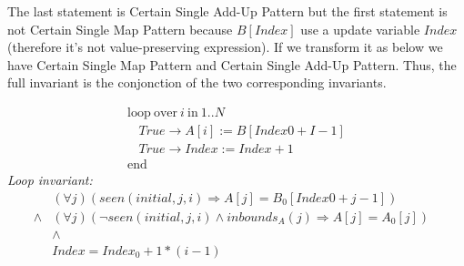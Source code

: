 \documentclass[a4paper,10pt]{article}
\newcommand{\idx}{\ensuremath{i}\xspace}
\newcommand{\idxinitial}{\ensuremath{\mathit{initial}}\xspace}
\newcommand{\KWloop}{\ensuremath{\mathrm{loop}~}}
\newcommand{\KWend}{\ensuremath{\mathrm{end}~}}
\newcommand{\KWover}{\ensuremath{\mathrm{over}~}}
\newcommand{\KWin}{\ensuremath{~\mathrm{in}~}}
\newcommand{\impl}{\ensuremath{\Longrightarrow}}
\newcommand{\inbounds}[2]{\ensuremath{\mathit{inbounds}_{#1}(#2)}\xspace}
\newcommand{\seen}[3]{\ensuremath{\mathit{seen}{(#1,#2,#3)}}\xspace}
\newcommand{\loopinvariant}{\noindent\textit{Loop invariant:}\xspace}
\begin{document}
The last statement is Certain Single Add-Up Pattern but the first statement is not Certain Single Map Pattern
because $B[Index]$ use a update variable $Index$ (therefore it's not value-preserving expression). 
If we transform it as below we have Certain Single Map Pattern and Certain Single Add-Up Pattern. 
Thus, the full invariant is the conjonction of the two corresponding invariants.

$$\begin{array}{l}
  \KWloop \KWover i \KWin 1 .. N \\
  ~~~~ True \rightarrow A[i]   := B[Index0 + I-1]\\
  ~~~~ True \rightarrow Index := Index + 1\\
  \KWend
\end{array}$$
%
\loopinvariant
%
\begin{eqnarray*}
&(\forall j)(\seen{\idxinitial}{j}{\idx} \impl A[j] = B_0[Index0 + j-1]) \\
\land& (\forall j)(\neg \seen{\idxinitial}{j}{\idx} \land \inbounds{A}{j} \impl A[j] = A_0[j])\\
&\land& \\
&Index = Index_0 + 1 * (i-1)&
\end{eqnarray*}



\end{document}
